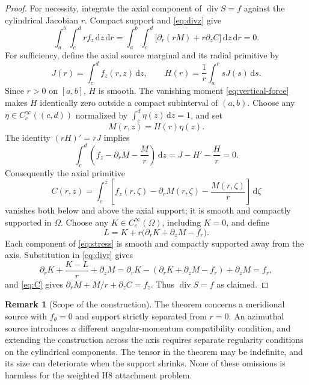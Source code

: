 \documentclass[11pt,a4paper]{article}
\theoremstyle{plain}
\theoremstyle{definition}
\newtheorem{remark}[theorem]{Remark}
\newcommand{\diver}{\operatorname{div}}
\newcommand{\cc}{C_c^{\infty}}
\newcommand{\dd}{\,\mathrm{d}}
\begin{document}
\begin{proof}
For necessity, integrate the axial component of $\diver S=f$
against the cylindrical Jacobian $r$. Compact support and
\eqref{eq:divz} give
\[
 \int_a^b\int_c^d r f_z\dd z\dd r
 =\int_a^b\int_c^d\bigl[\partial_r(rM)+r\partial_zC\bigr]
   \dd z\dd r=0.
\]
For sufficiency, define the axial source marginal and its radial
primitive by
\begin{equation}\label{eq:HJ}
 J(r)=\int_c^d f_z(r,z)\dd z,
 \qquad H(r)=\frac1r\int_a^r sJ(s)\dd s.
\end{equation}
Since $r>0$ on $[a,b]$, $H$ is smooth. The vanishing moment
\eqref{eq:vertical-force} makes $H$ identically zero outside a compact
subinterval of $(a,b)$. Choose any $\eta\in\cc((c,d))$ normalized by
$\int_c^d\eta(z)\dd z=1$, and set
\begin{equation}\label{eq:M}
 M(r,z)=H(r)\eta(z).
\end{equation}
The identity $(rH)'=rJ$ implies
\[
 \int_c^d\left(f_z-\partial_rM-\frac Mr\right)\dd z
   =J-H'-\frac Hr=0.
\]
Consequently the axial primitive
\begin{equation}\label{eq:C}
 C(r,z)=\int_c^z\left[f_z(r,\zeta)-\partial_rM(r,\zeta)
                  -\frac{M(r,\zeta)}r\right]\dd\zeta
\end{equation}
vanishes both below and above the axial support; it is smooth and
compactly supported in $\Omega$. Choose any $K\in\cc(\Omega)$,
including $K=0$, and define
\begin{equation}\label{eq:L}
 L=K+r\bigl(\partial_rK+\partial_zM-f_r\bigr).
\end{equation}
Each component of \eqref{eq:stress} is smooth and compactly supported
away from the axis. Substitution in \eqref{eq:divr} gives
\[
 \partial_rK+\frac{K-L}{r}+\partial_zM
 =\partial_rK-(\partial_rK+\partial_zM-f_r)+\partial_zM=f_r,
\]
and \eqref{eq:C} gives $\partial_rM+M/r+\partial_zC=f_z$.
Thus $\diver S=f$ as claimed.
\end{proof}

\begin{remark}[Scope of the construction]
The theorem concerns a meridional source with $f_\theta=0$ and support
strictly separated from $r=0$. An azimuthal source introduces a
different angular-momentum compatibility condition, and extending
the construction across the axis requires separate regularity
conditions on the cylindrical components. The tensor in the theorem
may be indefinite, and its size can deteriorate when the support
shrinks. None of these omissions is harmless for the weighted H8
attachment problem.
\end{remark}
\end{document}
